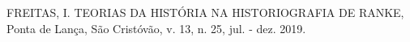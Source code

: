 \documentclass[
12pt,		%
openright,	%
twoside,  %
a4paper,			%
chapter=TITLE,		%
english,			%
french,				%
spanish,			%
brazil				%
]{USPSC-classe/USPSC_RedarTex}
\begin{document}
\begin{flushleft}
\begin{flushleft}
\begin{flushleft}
\begin{flushleft}
\begin{flushleft}
\begin{flushleft}
\begin{flushleft}
\begin{flushleft}
\begin{flushleft}
\begin{flushleft}
[FREITAS, 2019] FREITAS, I. TEORIAS DA HIST\'ORIA NA HISTORIOGRAFIA DE RANKE, Ponta de Lan\c{c}a, S\~ao Crist\'ov\~ao, v. 13, n. 25, jul. - dez. 2019.
\end{flushleft}


\end{flushleft}


\end{flushleft}


\end{flushleft}


\end{flushleft}


\end{flushleft}


\end{flushleft}


\end{flushleft}


\end{flushleft}


\end{flushleft}
\end{document}
